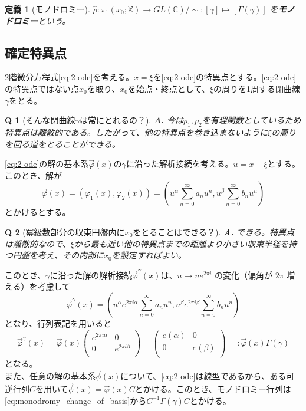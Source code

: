 \documentclass[paper=a4, fontsize=11pt]{jlreq} %
\theoremstyle{break}
\newtheorem{definition}[theorem]{定義}
\theoremstyle{qa}
\newtheorem*{Q}{Q}
\theoremstyle{remark} %
\begin{document}
\begin{definition}[モノドロミー]\label{def:monodromy}
     $\hat{\rho} : \pi_{1}(x_{0};\mathbb{X})\to GL(\mathbb{C})/\sim ; [\gamma] \mapsto [\Gamma(\gamma)]$ を\textbf{モノドロミー}という。
\end{definition}
\subsection{確定特異点}

2階微分方程式\eqref{eq:2-ode}を考える。$x=\xi$を\eqref{eq:2-ode}の特異点とする。\eqref{eq:2-ode}の特異点ではない点$x_{0}$を取り、$x_{0}$を始点・終点として、$\xi$の周りを1周する閉曲線$\gamma$をとる。

\begin{Q}[そんな閉曲線$\gamma$は常にとれるの？]
\textbf{A.} 今は$p_{1}, p_{2}$を有理関数としているため特異点は離散的である。したがって、他の特異点を巻き込まないように$\xi$の周りを回る道をとることができる。
\end{Q}

\eqref{eq:2-ode}の解の基本系$\vec{\varphi}(x)$の$\gamma$に沿った解析接続を考える。$u=x-\xi$とする。このとき、解が
\[
\vec{\varphi}(x)=(\varphi_{1}(x),\varphi_{2}(x))=\left(u^{\alpha}\sum_{n=0}^{\infty}a_{n}u^{n},u^{\beta}\sum_{n=0}^{\infty}b_{n}u^{n}\right)
\]
とかけるとする。

\begin{Q}[冪級数部分の収束円盤内に$x_{0}$をとることはできる？]
\textbf{A.} できる。特異点は離散的なので、$\xi$から最も近い他の特異点までの距離より小さい収束半径を持つ円盤を考え、その内部に$x_{0}$を設定すればよい。
\end{Q}

このとき、$\gamma$に沿った解の解析接続$\vec{\varphi}^{\gamma}(x)$は、$u \to ue^{2\pi i}$ の変化（偏角が $2\pi$ 増える）を考慮して
\[
\vec{\varphi}^{\gamma}(x)=\left(u^{\alpha}e^{2\pi i\alpha}\sum_{n=0}^{\infty}a_{n}u^{n},u^{\beta}e^{2\pi i\beta}\sum_{n=0}^{\infty}b_{n}u^{n}\right)
\]
となり、行列表記を用いると
\[
\vec{\varphi}^{\gamma}(x)=\vec{\varphi}(x)
\begin{pmatrix}
    e^{2\pi i\alpha} & 0 \\
    0 & e^{2\pi i\beta} \\
\end{pmatrix}
=
\begin{pmatrix}
    e(\alpha) & 0 \\
    0 & e(\beta) \\
\end{pmatrix}
=:\vec{\varphi}(x)\Gamma(\gamma)
\]
となる。\\
また、任意の解の基本系$\vec{\phi}(x)$について、\eqref{eq:2-ode}は線型であるから、ある可逆行列$C$を用いて$\vec{\phi}(x)=\vec{\varphi}(x)C$とかける。このとき、モノドロミー行列は\eqref{eq:monodromy_change_of_basis}から$C^{-1}\Gamma(\gamma) C$とかける。
\end{document}
